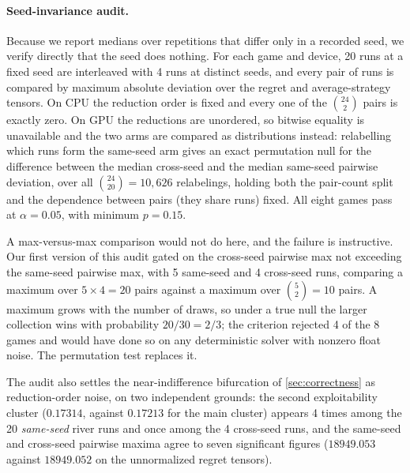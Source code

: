 \paragraph{Seed-invariance audit.}
Because we report medians over repetitions that differ only in a recorded seed, we
verify directly that the seed does nothing. For each game and device, 20 runs at a
fixed seed are interleaved with 4 runs at distinct seeds, and every pair of runs is
compared by maximum absolute deviation over the regret and average-strategy tensors.
On CPU the reduction order is fixed and every one of the $\binom{24}{2}$ pairs is
exactly zero. On GPU the reductions are unordered, so bitwise equality is
unavailable and the two arms are compared as distributions instead: relabelling
which runs form the same-seed arm gives an exact permutation null for the difference
between the median cross-seed and the median same-seed pairwise deviation, over all
$\binom{24}{20} = 10{,}626$ relabelings, holding both the pair-count split
and the dependence between pairs (they share runs) fixed. All eight games pass at
$\alpha = 0.05$, with minimum $p = 0.15$.

A max-versus-max comparison would not do here, and the failure is instructive. Our
first version of this audit gated on the cross-seed pairwise max not exceeding the
same-seed pairwise max, with 5 same-seed
and 4 cross-seed runs, comparing a maximum over $5 \times 4 = 20$ pairs against a
maximum over $\binom{5}{2} = 10$ pairs. A maximum grows with the number of draws, so
under a true null the larger collection wins with probability $20/30 = 2/3$; the
criterion rejected 4 of the 8 games and would have done so on any deterministic
solver with nonzero float noise. The permutation test replaces it.

The audit also settles the near-indifference bifurcation of \cref{sec:correctness}
as reduction-order noise, on two independent grounds:
the second exploitability cluster ($0.17314$, against $0.17213$ for the main
cluster) appears 4 times among the 20 \emph{same-seed} river runs and once among
the 4 cross-seed runs, and the same-seed and cross-seed pairwise maxima agree to
seven significant figures ($18949.053$ against $18949.052$ on the unnormalized
regret tensors).

